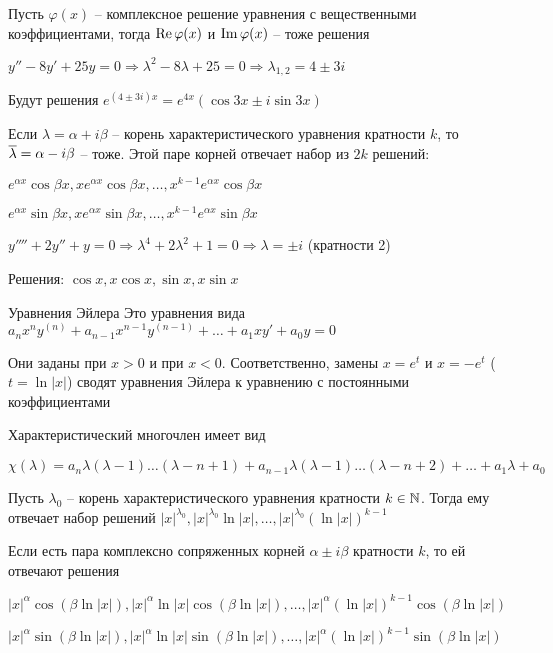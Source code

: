 \documentclass[12pt]{article}
\begin{document}
\begin{lem}{}
    Пусть $\varphi(x)$ -- комплексное решение уравнения с вещественными коэффициентами, тогда $\operatorname{Re} \varphi(x)$ и $\operatorname{Im} \varphi(x)$ -- тоже решения 
\end{lem}

\begin{Example}{}
    $y'' - 8y' + 25y = 0 \Rightarrow \lambda^2 - 8\lambda + 25 = 0 \Rightarrow \lambda_{1, 2} = 4 \pm 3i$

    Будут решения $e^{(4 \pm 3i)x} = e^{4x}(\cos 3x \pm i\sin 3x)$ 
\end{Example}

\begin{Remark}{}
    Если $\lambda = \alpha + i\beta$ -- корень характеристического уравнения кратности $k$, то $\overline{\lambda} = \alpha - i\beta$ -- тоже. Этой паре корней отвечает набор из $2k$ решений:

    $e^{\alpha x}\cos \beta x, xe^{\alpha x}\cos \beta x, \ldots, x^{k - 1}e^{\alpha x}\cos \beta x$

    $e^{\alpha x}\sin \beta x, xe^{\alpha x}\sin \beta x, \ldots, x^{k - 1}e^{\alpha x}\sin \beta x$
\end{Remark}

\begin{Example}{}
    $y'''' + 2y'' + y = 0 \Rightarrow \lambda^4 + 2\lambda^2 + 1 = 0 \Rightarrow \lambda = \pm i$ (кратности 2)

    Решения: $\cos x, x\cos x, \sin x, x\sin x$
\end{Example}

\begin{defin}{Уравнения Эйлера}
    Это уравнения вида $a_nx^ny^{(n)} + a_{n - 1}x^{n - 1}y^{(n - 1)} + \ldots + a_1xy' + a_0y = 0$

    Они заданы при $x > 0$ и при $x < 0$. Соответственно, замены $x = e^t$ и $x = -e^t$ ($t = \ln|x|$) сводят уравнения Эйлера к уравнению с постоянными коэффициентами 

    Характеристический многочлен имеет вид 
    
    $\chi(\lambda) = a_n\lambda(\lambda - 1)\ldots(\lambda - n + 1) + a_{n - 1}\lambda(\lambda - 1)\ldots(\lambda - n + 2) + \ldots + a_1\lambda + a_0$
\end{defin}

\begin{lem}{}
    Пусть $\lambda_0$ -- корень характеристического уравнения кратности $k \in \mathbb N$. Тогда ему отвечает набор решений $|x|^{\lambda_0}, |x|^{\lambda_0}\ln|x|, \ldots, |x|^{\lambda_0}(\ln|x|)^{k - 1}$

    Если есть пара комплексно сопряженных корней $\alpha \pm i\beta$ кратности $k$, то ей отвечают решения 

    $|x|^{\alpha}\cos(\beta \ln|x|), |x|^{\alpha}\ln|x|\cos(\beta \ln|x|), \ldots, |x|^{\alpha}(\ln|x|)^{k - 1}\cos(\beta \ln|x|)$

    $|x|^{\alpha}\sin(\beta \ln|x|), |x|^{\alpha}\ln|x|\sin(\beta \ln|x|), \ldots, |x|^{\alpha}(\ln|x|)^{k - 1}\sin(\beta \ln|x|)$
\end{lem}
\end{document}
